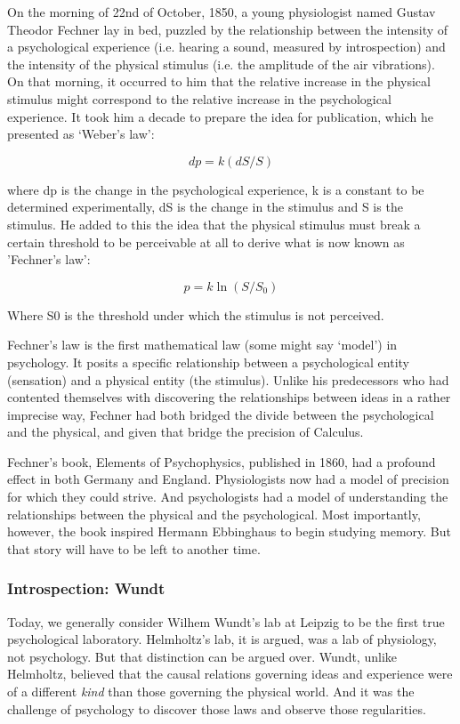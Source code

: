 \begin{refsection}
On the morning of 22nd of October, 1850, a young physiologist named Gustav Theodor Fechner lay in bed, puzzled by the relationship between the intensity of a psychological experience (i.e. hearing a sound, measured by introspection) and the intensity of the physical stimulus (i.e. the amplitude of the air vibrations). On that morning, it occurred to him that the relative increase in the physical stimulus might correspond to the relative increase in the psychological experience. It took him a decade to prepare the idea for publication, which he presented as `Weber's law':

\[ dp  = k(dS/S) \]

where dp is the change in the psychological experience, k is a constant to be determined experimentally, dS is the change in the stimulus and S is the stimulus. He added to this the idea that the physical stimulus must break a certain threshold to be perceivable at all to derive what is now known as 'Fechner's law’:

\[ p = k\ln(S/S_{0}) \] 

Where S0 is the threshold under which the stimulus is not perceived.

Fechner's law is the first mathematical law (some might say `model') in psychology. It posits a specific relationship between a psychological entity (sensation) and a physical entity (the stimulus). Unlike his predecessors who had contented themselves with discovering the relationships between ideas in a rather imprecise way, Fechner had both bridged the divide between the psychological and the physical, and given that bridge the precision of Calculus. 

Fechner's book, Elements of Psychophysics, published in 1860, had a profound effect in both Germany and England. Physiologists now had a model of precision for which they could strive. And psychologists had a model of understanding the relationships between the physical and the psychological. Most importantly, however, the book inspired Hermann Ebbinghaus to begin studying memory. But that story will have to be left to another time.

\subsubsection{Introspection: Wundt}
\label{introspection:wundt}

Today, we generally consider Wilhem Wundt's lab at Leipzig to be the first true psychological laboratory. Helmholtz's lab, it is argued, was a lab of physiology, not psychology. But that distinction can be argued over. Wundt, unlike Helmholtz, believed that the causal relations governing ideas and experience were of a different \emph{kind} than those governing the physical world. And it was the challenge of psychology to discover those laws and observe those regularities.


\end{refsection}
